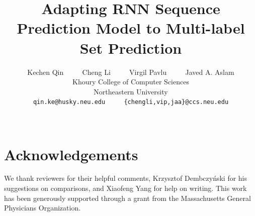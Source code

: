 \documentclass[11pt,a4paper]{article}
\title{Adapting RNN Sequence Prediction Model to Multi-label Set Prediction}
\author{Kechen Qin ~~~~ Cheng Li ~~~~ Virgil Pavlu ~~~~ Javed A. Aslam\\
  Khoury College of Computer Sciences \\
  Northeastern University\\
{\tt qin.ke@husky.neu.edu} ~~~~ {\tt \{chengli,vip,jaa\}@ccs.neu.edu}\\
   \\}
\date{}
\begin{document}
\maketitle
\begin{abstract}

\end{abstract}


% 







\section{Acknowledgements}
We thank reviewers for their helpful comments, 
Krzysztof Dembczyński for his suggestions on comparisons, and
Xiaofeng Yang for help on writing. This work
has been generously supported through a grant from the
Massachusetts General Physicians Organization.
% 
\clearpage
\newpage




\appendix
\end{document}
